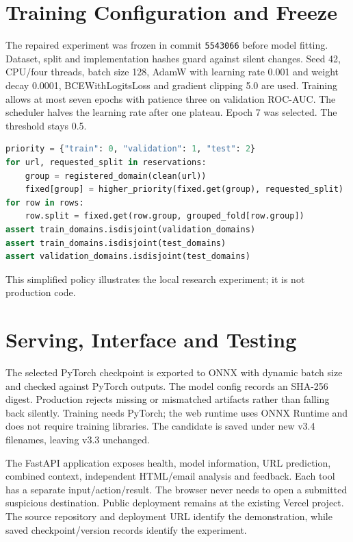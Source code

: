 \section{Training Configuration and Freeze}
The repaired experiment was frozen in commit \texttt{5543066} before model fitting. Dataset, split and implementation hashes guard against silent changes. Seed 42, CPU/four threads, batch size 128, AdamW with learning rate 0.001 and weight decay 0.0001, BCEWithLogitsLoss and gradient clipping 5.0 are used. Training allows at most seven epochs with patience three on validation ROC-AUC. The scheduler halves the learning rate after one plateau. Epoch 7 was selected. The threshold stays 0.5.

\begin{lstlisting}[language=Python,caption={Whole-group reservation policy (simplified)}]
priority = {"train": 0, "validation": 1, "test": 2}
for url, requested_split in reservations:
    group = registered_domain(clean(url))
    fixed[group] = higher_priority(fixed.get(group), requested_split)
for row in rows:
    row.split = fixed.get(row.group, grouped_fold[row.group])
assert train_domains.isdisjoint(validation_domains)
assert train_domains.isdisjoint(test_domains)
assert validation_domains.isdisjoint(test_domains)
\end{lstlisting}
This simplified policy illustrates the local research experiment; it is not production code.

\section{Serving, Interface and Testing}
The selected PyTorch checkpoint is exported to ONNX with dynamic batch size and checked against PyTorch outputs. The model config records an SHA-256 digest. Production rejects missing or mismatched artifacts rather than falling back silently. Training needs PyTorch; the web runtime uses ONNX Runtime and does not require training libraries. The candidate is saved under new v3.4 filenames, leaving v3.3 unchanged.

The FastAPI application exposes health, model information, URL prediction, combined context, independent HTML/email analysis and feedback. Each tool has a separate input/action/result. The browser never needs to open a submitted suspicious destination. Public deployment remains at the existing Vercel project. The source repository and deployment URL identify the demonstration, while saved checkpoint/version records identify the experiment.

